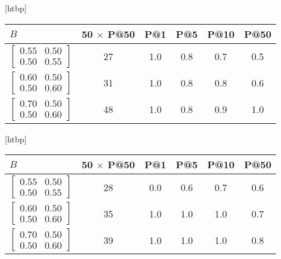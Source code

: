 \documentclass{tufte-handout}
\makeatletter
\renewenvironment{table}[1][htbp]{%
\@tufte@orig@float{table}[#1]}{%
\@tufte@orig@endfloat}%
\makeatother
\begin{document}
\begin{table}[htbp]
  \begin{tabular}{l c c c c c}
    $B$ & 50 $\times$ P@50 & P@1 & P@5 & P@10 & P@50 \\ \toprule
  $\begin{bmatrix} 0.55 & 0.50 \\0.50 &0.55 \end{bmatrix}$ & 27 & 1.0 & 0.8 & 0.7 & 0.5 \\
  $\begin{bmatrix} 0.60 & 0.50 \\0.50 &0.60 \end{bmatrix}$ & 31 & 1.0 & 0.8 & 0.8 & 0.6 \\
  $\begin{bmatrix} 0.70 & 0.50 \\0.50 &0.60 \end{bmatrix}$ & 48 & 1.0 & 0.8 & 0.9 & 1.0 \\
  \end{tabular}
  \caption{Performance vs B Matrix. RESCAL Algorithm. Seed=1234, Directed, Training Size=20}
  \label{tab:perf-vs-b-2}
\end{table}

\begin{table}[htbp]
  \begin{tabular}{l c c c c c}
    $B$ & 50 $\times$ P@50 & P@1 & P@5 & P@10 & P@50 \\ \toprule
  $\begin{bmatrix} 0.55 & 0.50 \\0.50 &0.55 \end{bmatrix}$ & 28 & 0.0 & 0.6 & 0.7 & 0.6 \\
  $\begin{bmatrix} 0.60 & 0.50 \\0.50 &0.60 \end{bmatrix}$ & 35 & 1.0 & 1.0 & 1.0 & 0.7 \\
  $\begin{bmatrix} 0.70 & 0.50 \\0.50 &0.60 \end{bmatrix}$ & 39 & 1.0 & 1.0 & 1.0 & 0.8 \\
  \end{tabular}
  \caption{Performance vs B Matrix. RESCAL Algorithm. Seed=0, Undirected, Training Size=20}
  \label{tab:perf-vs-b-3}
\end{table}
\end{document}
